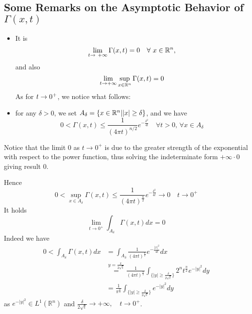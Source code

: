 \subsection{Some Remarks on the Asymptotic Behavior of $\Gamma (x,t)$ }
\begin{itemize}
    \item It is 
  \[
  \lim_{t \to\ +\infty} \Gamma (x,t) = 0 \quad \forall \ x \in \mathbb{R}^n, 
  \]
  and also 
  \begin{equation*}
      \lim_{t \to +\infty}\sup_{x \in \mathbb{R}^n}\Gamma (x,t) = 0 
  \end{equation*}
  As for $t\rightarrow 0^+$, we notice what follows:    
  \item for any $\delta>0$, we set $A_\delta= \{x \in \mathbb{R}^n| |x| \geq \delta \}$, and we have 
  \begin{equation*}
      0 < \Gamma(x,t)\leq \frac{1}{(4 \pi t )^{n/2}} e ^{-\frac{\delta^2}{4t}} \quad \forall t >0, \, \forall x \in A_\delta
  \end{equation*}
\end{itemize}
\begin{remark}
    Notice that the limit $0$ as $t \rightarrow 0^+$ is due to the greater strength of the exponential with respect to the power function, thus solving the indeterminate form $+\infty \cdot 0$ giving result $0$. \\
\end{remark}
Hence 
\begin{equation*}
    0 < \sup_{x \in A_\delta} \Gamma(x,t) \leq \frac{1}{(4\pi t)^\frac{n}{2}} e^{-\frac{\delta^2}{4t}} \rightarrow 0 \quad t \rightarrow 0^+
\end{equation*}
It holds 
\begin{equation*}
    \lim_{t \rightarrow 0^+} \int_{A_\delta} \Gamma(x,t) dx = 0
\end{equation*}
Indeed we have 
\begin{align*}
    0 < \int_{A_\delta} \Gamma(x,t) dx &= \int_{A_\delta} \frac{1}{(4 \pi t)^\frac{n}{2}} e^{- \frac{|x|^2}{4t}} dx \\
    &\stackrel{y = \frac{x}{2 \sqrt{t}}}= \frac{1}{(4 \pi t)^\frac{n}{2}} \int_{\{|y| \geq \frac{\delta}{2 \sqrt{t}}\}} 2^n t^\frac{n}{2}e^{-|y|^2} dy\\
    &= \frac{1}{\pi ^\frac{n}{2}}\int_{\{|y| \geq \frac{\delta}{2 \sqrt{t}}\}} e^{-|y|^2} dy 
\end{align*}
as $e^{-|y|^2} \in L^1(\mathbb{R}^n)$ and $\frac{\delta}{2 \sqrt{t}} \rightarrow +\infty, \quad t \rightarrow 0^+$.\\
